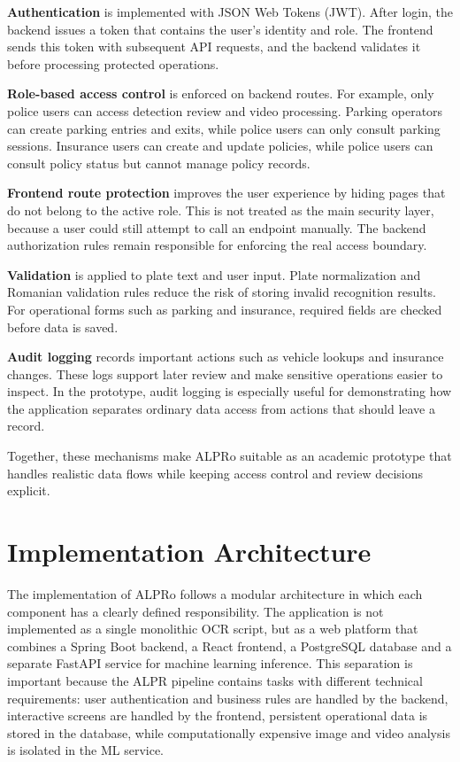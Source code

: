﻿\documentclass[12pt,a4paper]{article}
\begin{document}
\textbf{Authentication} is implemented with JSON Web Tokens (JWT). After login, the backend issues a token that contains the user's identity and role. The frontend sends this token with subsequent API requests, and the backend validates it before processing protected operations.

\textbf{Role-based access control} is enforced on backend routes. For example, only police users can access detection review and video processing. Parking operators can create parking entries and exits, while police users can only consult parking sessions. Insurance users can create and update policies, while police users can consult policy status but cannot manage policy records.

\textbf{Frontend route protection} improves the user experience by hiding pages that do not belong to the active role. This is not treated as the main security layer, because a user could still attempt to call an endpoint manually. The backend authorization rules remain responsible for enforcing the real access boundary.

\textbf{Validation} is applied to plate text and user input. Plate normalization and Romanian validation rules reduce the risk of storing invalid recognition results. For operational forms such as parking and insurance, required fields are checked before data is saved.

\textbf{Audit logging} records important actions such as vehicle lookups and insurance changes. These logs support later review and make sensitive operations easier to inspect. In the prototype, audit logging is especially useful for demonstrating how the application separates ordinary data access from actions that should leave a record.

Together, these mechanisms make ALPRo suitable as an academic prototype that handles realistic data flows while keeping access control and review decisions explicit.

\newpage



\section{Implementation Architecture}

The implementation of ALPRo follows a modular architecture in which each component has a clearly defined responsibility. The application is not implemented as a single monolithic OCR script, but as a web platform that combines a Spring Boot backend, a React frontend, a PostgreSQL database and a separate FastAPI service for machine learning inference. This separation is important because the ALPR pipeline contains tasks with different technical requirements: user authentication and business rules are handled by the backend, interactive screens are handled by the frontend, persistent operational data is stored in the database, while computationally expensive image and video analysis is isolated in the ML service.
\end{document}
